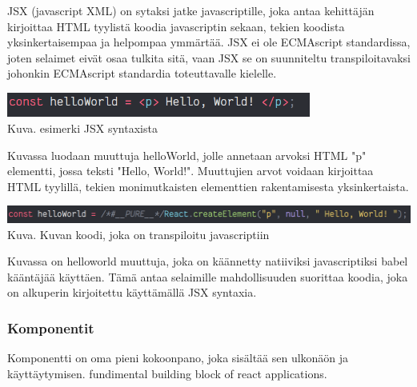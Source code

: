 
JSX (javascript XML) on sytaksi jatke javascriptille, joka antaa kehittäjän kirjoittaa HTML tyylistä koodia javascriptin sekaan, tekien koodista yksinkertaisempaa ja helpompaa ymmärtää. 
JSX ei ole ECMAscript standardissa, joten selaimet eivät osaa tulkita sitä, vaan JSX se on suunniteltu transpiloitavaksi johonkin ECMAscript standardia toteuttavalle kielelle.
\medskip

\bigskip
\includegraphics[width=10cm]{src/public/oppar/pure_jsx_example.png}\\
Kuva\getImgCount .{} esimerki JSX syntaxista
\medskip

Kuvassa luodaan muuttuja helloWorld, jolle annetaan arvoksi HTML "p"{} elementti, jossa teksti "Hello, World!"{}.
Muuttujien arvot voidaan kirjoittaa HTML tyylillä, tekien monimutkaisten elementtien rakentamisesta yksinkertaista.
\medskip



\bigskip
\includegraphics[width=15cm]{src/public/oppar/transpiled_jsx_example.png}\\
Kuva\getImgCount .{} Kuvan \prevImageCount{} koodi, joka on transpiloitu javascriptiin
\medskip


Kuvassa on helloworld muuttuja, joka on käännetty natiiviksi javascriptiksi babel kääntäjää käyttäen. 
Tämä antaa selaimille mahdollisuuden suorittaa koodia, joka on alkuperin kirjoitettu käyttämällä JSX syntaxia.
\medskip



\subsubsection{Komponentit}




Komponentti on oma pieni kokoonpano, joka sisältää sen ulkonäön ja käyttäytymisen.
fundimental building block of react applications.
\medskip


